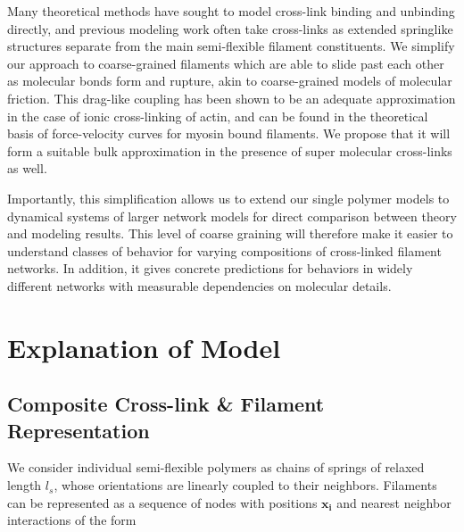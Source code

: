 \documentclass[pre,reprint]{revtex4-1}
\begin{document}
Many theoretical methods have sought to model cross-link binding and unbinding directly\cite{theo_crosslinkslip1,theo_crosslinkslip2}, and previous modeling work often take cross-links as extended springlike structures \cite{model_taeyoon} separate from the main semi-flexible filament constituents.  We simplify our approach to coarse-grained filaments which are able to slide past each other as molecular bonds form and rupture, akin to coarse-grained models of molecular friction\cite{theo_friction,theo_frictionSam,theo_molefric}.  This drag-like coupling has been shown to be an adequate approximation in the case of ionic cross-linking of actin\cite{mol_fric,theo_hydroish2}, and can be found in the theoretical basis of force-velocity curves for myosin bound filaments\cite{theo_frictionShila}. We propose that it will form a suitable bulk approximation in the presence of super molecular cross-links as well.

Importantly, this simplification allows us to extend our single polymer models to dynamical systems of larger network models for direct comparison between theory and modeling results.  This level of coarse graining will therefore make it easier to understand classes of behavior for varying compositions of cross-linked filament networks.  In addition, it gives concrete predictions for behaviors in widely different networks with measurable dependencies on molecular details.






















\section{Explanation of Model}

\subsection{Composite Cross-link \& Filament Representation}
We consider individual semi-flexible polymers as chains of springs of relaxed length $l_s$, whose orientations are linearly coupled to their neighbors. Filaments can be represented as a sequence of nodes with positions $\mathbf{x_i}$ and nearest neighbor interactions of the form
\end{document}
